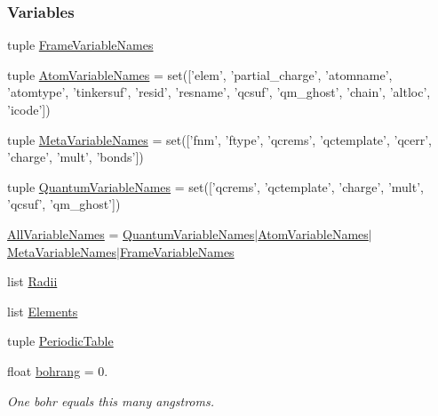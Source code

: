 \subsubsection*{Variables}
\begin{DoxyCompactItemize}
\item 
tuple \hyperlink{namespaceforcebalance_1_1molecule_a0044fa397e0923635a8b3e9625aa70f7}{Frame\-Variable\-Names}
\item 
tuple \hyperlink{namespaceforcebalance_1_1molecule_a5daa68e835dcb9877d6c3f2fb559b54b}{Atom\-Variable\-Names} = set(\mbox{[}'elem', 'partial\-\_\-charge', 'atomname', 'atomtype', 'tinkersuf', 'resid', 'resname', 'qcsuf', 'qm\-\_\-ghost', 'chain', 'altloc', 'icode'\mbox{]})
\item 
tuple \hyperlink{namespaceforcebalance_1_1molecule_a38e1c99e9567fe42b792af43db9b7488}{Meta\-Variable\-Names} = set(\mbox{[}'fnm', 'ftype', 'qcrems', 'qctemplate', 'qcerr', 'charge', 'mult', 'bonds'\mbox{]})
\item 
tuple \hyperlink{namespaceforcebalance_1_1molecule_ab67efeab6049ec1f416b9ad1eed6ffcc}{Quantum\-Variable\-Names} = set(\mbox{[}'qcrems', 'qctemplate', 'charge', 'mult', 'qcsuf', 'qm\-\_\-ghost'\mbox{]})
\item 
\hyperlink{namespaceforcebalance_1_1molecule_a8fcfb88fe12a9256b61980f3d4fe3b63}{All\-Variable\-Names} = \hyperlink{namespaceforcebalance_1_1molecule_ab67efeab6049ec1f416b9ad1eed6ffcc}{Quantum\-Variable\-Names}$\vert$\hyperlink{namespaceforcebalance_1_1molecule_a5daa68e835dcb9877d6c3f2fb559b54b}{Atom\-Variable\-Names}$\vert$\hyperlink{namespaceforcebalance_1_1molecule_a38e1c99e9567fe42b792af43db9b7488}{Meta\-Variable\-Names}$\vert$\hyperlink{namespaceforcebalance_1_1molecule_a0044fa397e0923635a8b3e9625aa70f7}{Frame\-Variable\-Names}
\item 
list \hyperlink{namespaceforcebalance_1_1molecule_a74f55a89a14ca676b5a06441d1fdab19}{Radii}
\item 
list \hyperlink{namespaceforcebalance_1_1molecule_a1c99a11e8a749468698c9af6361a8a4c}{Elements}
\item 
tuple \hyperlink{namespaceforcebalance_1_1molecule_adc5040ec456762f2ac240fb08febbfdd}{Periodic\-Table}
\item 
float \hyperlink{namespaceforcebalance_1_1molecule_a76af9edfbaaa8999680e32aafe1b1b61}{bohrang} = 0.
\begin{DoxyCompactList}\small\item\em One bohr equals this many angstroms. \end{DoxyCompactList}\item 

\end{DoxyCompactItemize}
